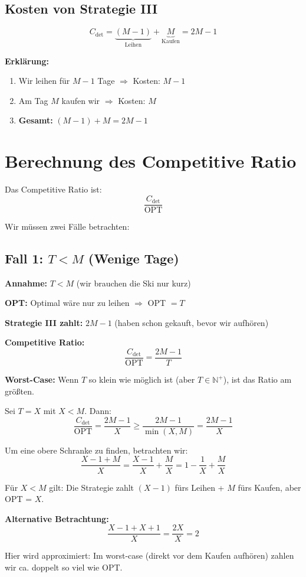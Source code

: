 \documentclass[12pt,a4paper]{article}
\theoremstyle{definition}
\begin{document}
\subsection{Kosten von Strategie III}

\[
C_{\text{det}} = \underbrace{(M-1)}_{\text{Leihen}} + \underbrace{M}_{\text{Kaufen}} = 2M - 1
\]

\textbf{Erklärung:}
\begin{enumerate}
    \item Wir leihen für $M-1$ Tage $\Rightarrow$ Kosten: $M-1$
    \item Am Tag $M$ kaufen wir $\Rightarrow$ Kosten: $M$
    \item \textbf{Gesamt:} $(M-1) + M = 2M - 1$
\end{enumerate}

\section{Berechnung des Competitive Ratio}

Das Competitive Ratio ist:
\[
\frac{C_{\text{det}}}{\text{OPT}}
\]

Wir müssen zwei Fälle betrachten:

\subsection{Fall 1: $T < M$ (Wenige Tage)}

\begin{tcolorbox}[colback=red!5!white,colframe=red!75!black]
\textbf{Annahme:} $T < M$ (wir brauchen die Ski nur kurz)

\textbf{OPT:} Optimal wäre nur zu leihen $\Rightarrow$ OPT $= T$

\textbf{Strategie III zahlt:} $2M - 1$ (haben schon gekauft, bevor wir aufhören)

\textbf{Competitive Ratio:}
\[
\frac{C_{\text{det}}}{\text{OPT}} = \frac{2M-1}{T}
\]

\textbf{Worst-Case:} Wenn $T$ so klein wie möglich ist (aber $T \in \mathbb{N}^+$), ist das Ratio am größten.

Sei $T = X$ mit $X < M$. Dann:
\[
\frac{C_{\text{det}}}{\text{OPT}} = \frac{2M-1}{X} \geq \frac{2M-1}{\min(X,M)} = \frac{2M-1}{X}
\]

Um eine obere Schranke zu finden, betrachten wir:
\[
\frac{X-1+M}{X} = \frac{X-1}{X} + \frac{M}{X} = 1 - \frac{1}{X} + \frac{M}{X}
\]

Für $X < M$ gilt: Die Strategie zahlt $(X-1)$ fürs Leihen + $M$ fürs Kaufen, aber OPT = $X$.

\textbf{Alternative Betrachtung:}
\[
\frac{X-1+X+1}{X} = \frac{2X}{X} = 2
\]

Hier wird approximiert: Im worst-case (direkt vor dem Kaufen aufhören) zahlen wir ca. doppelt so viel wie OPT.
\end{tcolorbox}
\end{document}
